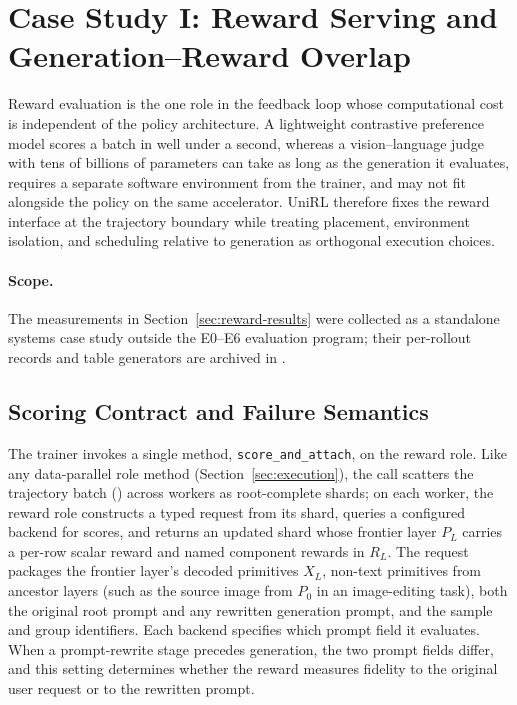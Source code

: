 

\section{Case Study I: Reward Serving and Generation--Reward Overlap}
\label{sec:reward}

Reward evaluation is the one role in the feedback loop whose computational cost is independent of the policy architecture.
A lightweight contrastive preference model scores a batch in well under a second, whereas a vision--language judge with tens of billions of parameters can take as long as the generation it evaluates, requires a separate software environment from the trainer, and may not fit alongside the policy on the same accelerator.
UniRL therefore fixes the reward interface at the trajectory boundary while treating placement, environment isolation, and scheduling relative to generation as orthogonal execution choices.

\paragraph{Scope.}
The measurements in Section~\ref{sec:reward-results} were collected as a standalone systems case study outside the E0--E6 evaluation program; their per-rollout records and table generators are archived in .

\subsection{Scoring Contract and Failure Semantics}
\label{sec:reward-contract}

The trainer invokes a single method, \texttt{score\_and\_attach}, on the reward role.
Like any data-parallel role method (Section~\ref{sec:execution}), the call scatters the trajectory batch (\sample{}) across workers as root-complete shards; on each worker, the reward role constructs a typed request from its shard, queries a configured backend for scores, and returns an updated shard whose frontier layer $P_L$ carries a per-row scalar reward and named component rewards in $R_L$.
The request packages the frontier layer's decoded primitives $X_L$, non-text primitives from ancestor layers (such as the source image from $P_0$ in an image-editing task), both the original root prompt and any rewritten generation prompt, and the sample and group identifiers.
Each backend specifies which prompt field it evaluates.
When a prompt-rewrite stage precedes generation, the two prompt fields differ, and this setting determines whether the reward measures fidelity to the original user request or to the rewritten prompt.

